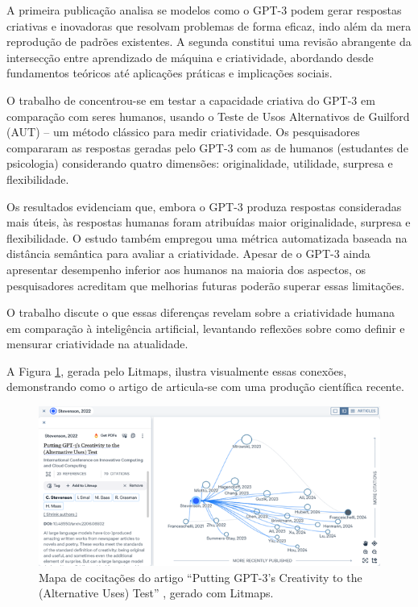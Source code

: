 \documentclass[portuguese]{textolivre}
\begin{document}
A primeira publicação analisa se modelos como o GPT-3 podem gerar respostas criativas e inovadoras que resolvam problemas de forma eficaz, indo além da mera reprodução de padrões existentes. A segunda constitui uma revisão abrangente da intersecção entre aprendizado de máquina e criatividade, abordando desde fundamentos teóricos até aplicações práticas e implicações sociais.

O trabalho de \textcite{stevenson2022} concentrou-se em testar a capacidade criativa do GPT-3 em comparação com seres humanos, usando o Teste de Usos Alternativos de Guilford (AUT) -- um método clássico para medir criatividade. Os pesquisadores compararam as respostas geradas pelo GPT-3 com as de humanos (estudantes de psicologia) considerando quatro dimensões: originalidade, utilidade, surpresa e flexibilidade.

Os resultados evidenciam que, embora o GPT-3 produza respostas consideradas mais úteis, às respostas humanas foram atribuídas maior originalidade, surpresa e flexibilidade. O estudo também empregou uma métrica automatizada baseada na distância semântica para avaliar a criatividade. Apesar de o GPT-3 ainda apresentar desempenho inferior aos humanos na maioria dos aspectos, os pesquisadores acreditam que melhorias futuras poderão superar essas limitações.

O trabalho discute o que essas diferenças revelam sobre a criatividade humana em comparação à inteligência artificial, levantando reflexões sobre como definir e mensurar criatividade na atualidade.

A Figura \ref{fig-4}, gerada pelo Litmaps, ilustra visualmente essas conexões, demonstrando como o artigo de \textcite{stevenson2022} articula-se com uma produção científica recente.

\begin{figure}[htbp]
\centering
\begin{minipage}{0.90\textwidth}
\includegraphics[width=\textwidth]{Imagens/fig-004.png}
\caption{Mapa de cocitações do artigo ``Putting GPT-3's Creativity to the (Alternative Uses) Test'' \cite{stevenson2022}, gerado com Litmaps.}
\label{fig-4}
\end{minipage}
\end{figure}
\end{document}
